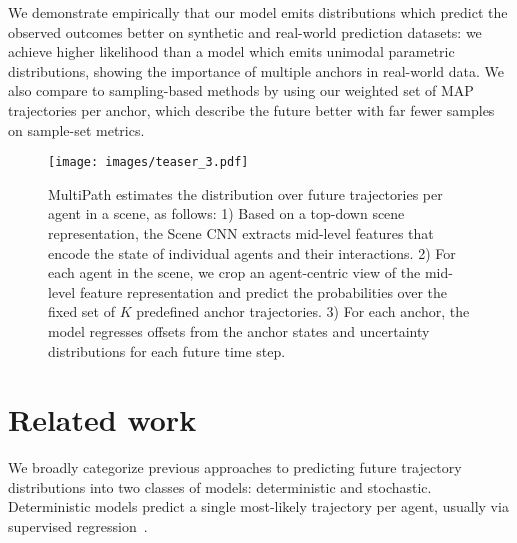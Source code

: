 \documentclass{article}
\newcommand{\out}[1]{}
\newcommand{\multiflow}{MultiPath\xspace}
\begin{document}
We demonstrate empirically that our model emits distributions which predict the observed outcomes better on synthetic and real-world prediction datasets: we achieve higher likelihood than a model which emits unimodal parametric distributions, showing the importance of multiple anchors in real-world data. We also compare to sampling-based methods by using our weighted set of MAP trajectories per anchor, which describe the future better with far fewer samples on sample-set metrics.
\out{

Notably, a large amount of previous work has modeled a {\em deterministic} future, providing only a single best guess at where agents might be~\cite{Luo18, Casas18, Sadeghian18, Pellegrini09, Bansal19}, which is of limited practical use.

One way to capture the inherent stochasticity of the future is via a set of trajectory samples, which should cover the space of possible outcomes well with as few samples as possible.  A common way to obtain such samples is from rolling out 1-time-step stochastic policies~\cite{Rhinehart18, Ma17, Kitani12}, or stochastic latent-space random sampling models such as Conditional Variational Auto-Encoders (CVAEs)~\cite{Lee17, Hong19, Bhattacharyya18BestOfMany, Ivanovic18}.
}
\begin{figure}[tb]
  \centering
\texttt{[image: images/teaser\_3.pdf]}
\caption{\small
 \multiflow estimates the distribution over future trajectories per agent in a scene, as follows: 1) Based on a top-down scene representation, the Scene CNN extracts mid-level features that encode the state of individual agents and their interactions. 2) For each agent in the scene, we crop an agent-centric view of the mid-level feature representation and predict the probabilities over the fixed set of $K$ predefined anchor trajectories. 3) For each anchor, the model regresses offsets from the anchor states and uncertainty distributions for each future time step.
 \vspace{-0.8cm}}
\label{fig:teaser}
\end{figure} \section{Related work} \label{sec:relwork}
We broadly categorize previous approaches to predicting future trajectory distributions into two classes of models: deterministic and stochastic. 
Deterministic models predict a single most-likely trajectory per agent, usually via supervised regression~\cite{Luo18, Casas18, Sadeghian18, Pellegrini09, Bansal19, Helbing95}.
\end{document}
